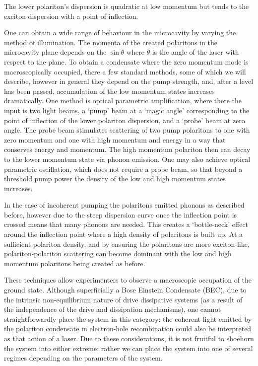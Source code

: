 \documentclass[letterpaper, 10 pt, conference]{IEEEtran}  %
\begin{document}
The lower polariton's dispersion is quadratic at low momentum but tends to the exciton dispersion with a point of inflection. 

One can obtain a wide range of behaviour in the microcavity by varying the method of illumination. 
The momenta of the created polaritons in the microcavity plane depends on the $\sin \theta$ where $\theta$ is the angle of the laser with respect to the plane. 
To obtain a condensate where the zero momentum mode is macroscopically occupied, there a few standard methods, some of which we will describe, however in general they depend on the pump strength, and, after a level has been passed, accumulation of the low momentum states increases dramatically.
One method is optical parametric amplification, where there the input is two light beams, a `pump' beam at a `magic angle' corresponding to the point of inflection of the lower polariton dispersion, and a `probe' beam at zero angle. 
The probe beam stimulates scattering of two pump polaritons to one with zero momentum and one with high momentum and energy in a way that conserves energy and momentum. 
The high momentum polariton then can decay to the lower momentum state via phonon emission.
One may also achieve optical parametric oscillation, which does not require a probe beam, so that beyond a threshold pump power the density of the low and high momentum states increases.

In the case of incoherent pumping the polaritons emitted phonons as described before, however due to the steep dispersion curve once the inflection point is crossed means that many phonons are needed. 
This creates a `bottle-neck' effect around the inflection point where a high density of polaritons is built up. 
At a sufficient polariton density, and by ensuring the polaritons are more exciton-like, polariton-polariton scattering can become dominant with the low and high momentum polaritons being created as before. 

These techniques allow experimenters to observe a macroscopic occupation of the ground state. 
Although superficially a Bose Einstein Condensate (BEC), due to the intrinsic non-equilibrium nature of drive dissipative systems (as a result of the independence of the drive and dissipation mechanisms), one cannot straightforwardly place the system in this category: the coherent light emitted by the polariton condensate in electron-hole recombination could also be interpreted as that action of a laser.  
Due to these considerations, it is not fruitful to shoehorn the system into either extreme; rather we can place the system into one of several regimes depending on the parameters of the system. 
\end{document}
